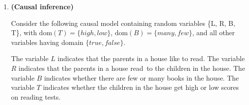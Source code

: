 \documentclass{article}
\newcounter{totalpoints}
\newcommand{\points}[1]{{\addtocounter{totalpoints}{#1}\textbf{[#1 points]}}}
\begin{document}
\begin{enumerate}
\begin{enumerate}
    \item \points{15}
    List the factors that would be created, and the operations used to create them, by running the variable elimination algorithm on this belief network to answer the query $P(B|G,E)$.
    Use the variable ordering $G,E,A,B,C,D,F$.



    \begin{answer}{1.5in} \label{q:order-a}
    \end{answer}

    \item \points{15} \label{q:order-b}
    List the factors that would be created, and the operations used to create them, by running the variable elimination algorithm on this belief network to answer the query $P(B|G,E)$.
    Use the variable ordering $G,E,F,D,C,B,A$

    \begin{answer}{1.5in}
    \end{answer}

    \item \points{5}
    Which of the two given variable orderings is more efficient for this query?  Justify your answer.
    You may assume that the domain of each variable is the same size.

    \begin{answer}{.5in}
    \end{answer}

\end{enumerate}

\newcommand{\Books}{B}
\newcommand{\Read}{R}
\newcommand{\Like}{L}
\newcommand{\Tests}{T}

\clearpage
\item \textbf{(Causal inference)}

Consider the following causal model containing random variables \{\Like, \Read, \Books, \Tests\}, with $\text{dom}(\Tests)=\{high,low\}$, $\text{dom}(\Books)=\{many,few\}$,
and all other variables having domain $\{true,false\}$.  

The variable $\Like$ indicates that the parents in a house {like to read}.
The variable $\Read$ indicates that the parents in a house {read~to} the children in the house.
The variable $\Books$ indicates whether there are few or many {books} in the house.
The variable $\Tests$ indicates whether the children in the house get high or low scores on reading {tests}.


\end{enumerate}
\end{document}
